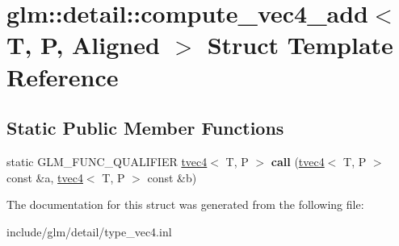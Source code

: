 \hypertarget{structglm_1_1detail_1_1compute__vec4__add}{}\section{glm\+:\+:detail\+:\+:compute\+\_\+vec4\+\_\+add$<$ T, P, Aligned $>$ Struct Template Reference}
\label{structglm_1_1detail_1_1compute__vec4__add}
\subsection*{Static Public Member Functions}
\begin{DoxyCompactItemize}
\item 
\mbox{\label{structglm_1_1detail_1_1compute__vec4__add_a04a9b82a1204c0c8f5fffe555a664906}} 
static G\+L\+M\+\_\+\+F\+U\+N\+C\+\_\+\+Q\+U\+A\+L\+I\+F\+I\+ER \hyperlink{structglm_1_1tvec4}{tvec4}$<$ T, P $>$ {\bfseries call} (\hyperlink{structglm_1_1tvec4}{tvec4}$<$ T, P $>$ const \&a, \hyperlink{structglm_1_1tvec4}{tvec4}$<$ T, P $>$ const \&b)
\end{DoxyCompactItemize}


The documentation for this struct was generated from the following file\+:\begin{DoxyCompactItemize}
\item 
include/glm/detail/type\+\_\+vec4.\+inl\end{DoxyCompactItemize}
